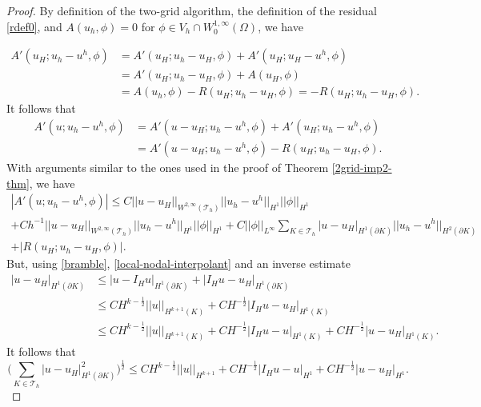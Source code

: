 \documentclass[12pt]{amsart}
\numberwithin{equation}{section}
\begin{document}
\begin{proof}
By definition of the two-grid algorithm, the definition of the residual \eqref{rdef0}, and $A(u_h,\phi)=0$ for $\phi \in V_h\cap  W^{1,\infty}_0(\Omega)$, we have

\begin{align*}
A'(u_H; u_h-u^h, \phi)&= A'(u_H; u_h-u_H, \phi) + A'(u_H; u_H-u^h, \phi) \\
& = A'(u_H; u_h-u_H, \phi) + A(u_H,\phi) \\
& = A(u_h,\phi) - R(u_H;u_h-u_H,\phi) = - R(u_H;u_h-u_H,\phi). 
\end{align*}
It follows that
\begin{align*}
A'(u; u_h-u^h, \phi)& = A'(u-u_H; u_h-u^h, \phi) + A'(u_H; u_h-u^h, \phi) \\
& = A'(u-u_H; u_h-u^h, \phi) - R(u_H;u_h-u_H,\phi). 
\end{align*}
With arguments similar to the ones used in the proof of Theorem \ref{2grid-imp2-thm}, we have
\begin{multline} \label{u-p-066}
| A'(u; u_h-u^h, \phi) | \leq C  || u - u_H ||_{W^{2,\infty}(\mathcal{T}_h)}  || u_h - u^h ||_{H^{1}} ||\phi||_{H^1} \\
+ C h^{-1} || u - u_H ||_{W^{2,\infty}(\mathcal{T}_h)}  || u_h - u^h ||_{H^{1}} ||\phi||_{H^1} 
+ C || \phi ||_{L^{\infty}} \sum_{K \in \mathcal{T}_h } | u - u_H |_{H^{1}(\partial K)} ||  u_h - u^h ||_{H^2(\partial K)}\\
+ |R(u_H;u_h-u_H,\phi)|.
\end{multline}
But, using \eqref{bramble}, \eqref{local-nodal-interpolant} and an inverse estimate
\begin{align*}
| u - u_H |_{H^{1}(\partial K)} & \leq | u - I_H u |_{H^{1}(\partial K)} + | I_H u - u_H |_{H^{1}(\partial K)} \\
& \leq C H^{k-\frac{1}{2}} ||u||_{H^{k+1}(K)} + C H^{-\frac{1}{2}}  | I_H u - u_H |_{H^{1}( K)} \\
& \leq C H^{k-\frac{1}{2}} ||u||_{H^{k+1}(K)} + C H^{-\frac{1}{2}}  | I_H u - u |_{H^{1}( K)} + C H^{-\frac{1}{2}}  | u - u_H |_{H^{1} ( K)}. 
\end{align*}
It follows that
$$
\bigg( \sum_{K \in \mathcal{T}_h } | u - u_H |^2_{H^{1}(\partial K)} \bigg)^{\frac{1}{2}} \leq C H^{k-\frac{1}{2}} ||u||_{H^{k+1}} + C H^{-\frac{1}{2}}  | I_H u - u |_{H^{1}} + C H^{-\frac{1}{2}}  | u - u_H |_{H^{1} }.
$$
\end{proof}
\end{document}
